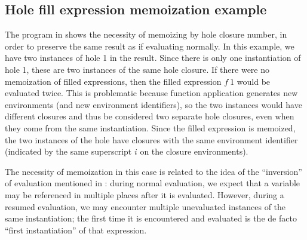 \subsection{Hole fill expression memoization example}
\label{sec:far-hole-fill-memoization-example}

The program in  shows the necessity of memoizing by hole closure number, in order to preserve the same result as if evaluating normally. In this example, we have two instances of hole 1 in the result. Since there is only one instantiation of hole 1, these are two instances of the same hole closure. If there were no memoization of filled expressions, then the filled expression $f\ 1$ would be evaluated twice. This is problematic because function application generates new environments (and new environment identifiers), so the two instances would have different closures and thus be considered two separate hole closures, even when they come from the same instantiation. Since the filled expression is memoized, the two instances of the hole have closures with the same environment identifier (indicated by the same superscript $i$ on the closure environments).

The necessity of memoization in this case is related to the idea of the ``inversion'' of evaluation mentioned in : during normal evaluation, we expect that a variable may be referenced in multiple places after it is evaluated. However, during a resumed evaluation, we may encounter multiple unevaluated instances of the same instantiation; the first time it is encountered and evaluated is the de facto ``first instantiation'' of that expression.

